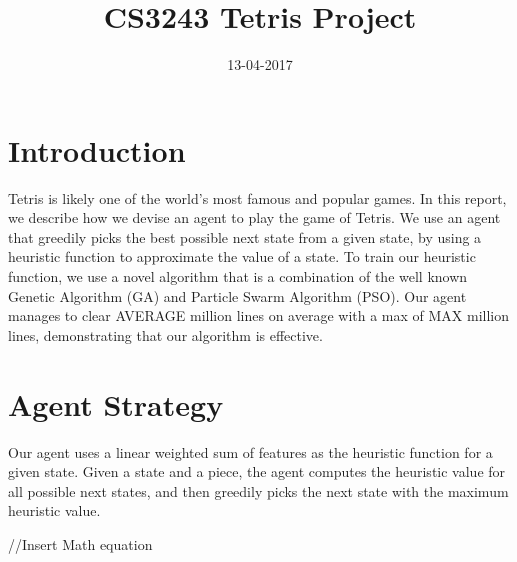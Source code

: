 \documentclass{article}
\title{CS3243 Tetris Project}
\date{13-04-2017}
\begin{document}
	\maketitle
	\thispagestyle{empty}
	\vspace{5mm}

    \section{Introduction}
    Tetris is likely one of the world's most famous and popular games.
    In this report, we describe how we devise an agent to play the game of Tetris.
    We use an agent that greedily picks the best possible next state from a given state,
    by using a heuristic function to approximate the value of a state. To train our heuristic
    function, we use a novel algorithm that is a combination of the well known Genetic Algorithm (GA)
    and Particle Swarm Algorithm (PSO). Our agent manages to clear AVERAGE million lines on average with a max
    of MAX million lines, demonstrating that our algorithm is effective.

    \section{Agent Strategy}
    Our agent uses a linear weighted sum of features as the heuristic function for a given state. Given a state and a piece, the agent computes
    the heuristic value for all possible next states, and then greedily picks the next state with
    the maximum heuristic value.

    //Insert Math equation
\end{document}
